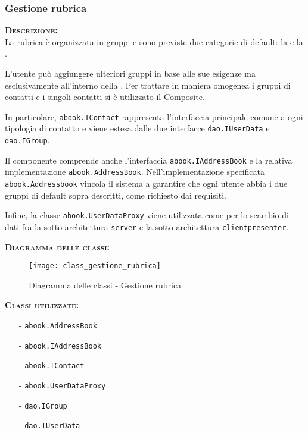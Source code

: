\subsubsection{Gestione rubrica}
\begin{description}
	\item{\scshape\bfseries Descrizione:}\\
La rubrica è organizzata in gruppi e sono previste due categorie di default: la  e la .

L'utente può aggiungere ulteriori gruppi in base alle sue esigenze ma esclusivamente all'interno della . Per trattare in maniera omogenea i gruppi di contatti e i singoli contatti si è utilizzato il  Composite.

In particolare, \texttt{abook.IContact} rappresenta l'interfaccia principale comune a ogni tipologia di contatto e viene estesa dalle due interfacce \texttt{dao.IUserData} e \texttt{dao.IGroup}.

Il componente comprende anche l'interfaccia \texttt{abook.IAddressBook} e la relativa implementazione \texttt{abook.AddressBook}. Nell'implementazione specificata \texttt{abook.Addressbook} vincola il sistema a garantire che ogni utente abbia i due gruppi di default sopra descritti, come richiesto dai requisiti.

Infine, la classe \texttt{abook.UserDataProxy} viene utilizzata come  per lo scambio di dati fra la sotto-architettura \texttt{server} e la sotto-architettura \texttt{clientpresenter}.
	\item{\scshape\bfseries Diagramma delle classi:}
	\begin{figure}[H]
\begin{center}
\texttt{[image: class\_gestione\_rubrica]}
\caption{Diagramma delle classi - Gestione rubrica}\label{fig:gestione_rubrica}
\end{center}
\end{figure}
	
	\item{\scshape\bfseries Classi utilizzate:}\\
	\begin{itemize}[nolistsep, noitemsep]
	  \item[-] \texttt{abook.AddressBook}
	  \item[-] \texttt{abook.IAddressBook}
	  \item[-] \texttt{abook.IContact}
	  \item[-] \texttt{abook.UserDataProxy}
	  \item[-] \texttt{dao.IGroup}
	  \item[-] \texttt{dao.IUserData}
	\end{itemize}
\end{description}

